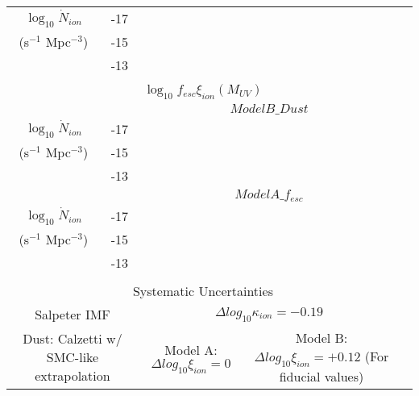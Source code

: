 \begin{table*}
\begin{tabular}{cc|cccccc}
$\log_{10} \dot{N}_{ion}$	 		& -17 &  \\
(s$^{-1}$ Mpc$^{-3}$) 				& -15 &  \\
												& -13 &  \\											

	 \multicolumn{7}{c}{}\\
	 \multicolumn{7}{c}{$\log_{10}f_{esc}\xi_{ion}(M_{UV})$}\\\hline
	 
	  & & \multicolumn{5}{c}{$ModelB\_Dust$}\\
	  
$\log_{10} \dot{N}_{ion}$	 		& -17 &  \\
(s$^{-1}$ Mpc$^{-3}$) 				& -15 &  \\
												& -13 &  \\
												
	  & & \multicolumn{5}{c}{$ModelA\_f_{esc}$}\\
	  
$\log_{10} \dot{N}_{ion}$	 		& -17 &  \\
(s$^{-1}$ Mpc$^{-3}$) 				& -15 &  \\
												& -13 &  \\		

	 \multicolumn{7}{c}{}\\
	 \multicolumn{7}{c}{Systematic Uncertainties}\\\hline
	 \multicolumn{2}{c}{Salpeter IMF} & \multicolumn{5}{c}{$\Delta log_{10}\kappa_{ion} = -0.19$}\\
	 \multicolumn{2}{c}{Dust: Calzetti w/ SMC-like extrapolation} &  \multicolumn{2}{c}{Model A: $\Delta log_{10}\xi_{ion} = 0$} & \multicolumn{3}{c}{Model B: $\Delta log_{10}\xi_{ion} = +0.12$ (For fiducial values)}\\

  \end{tabular}
\end{table*}





